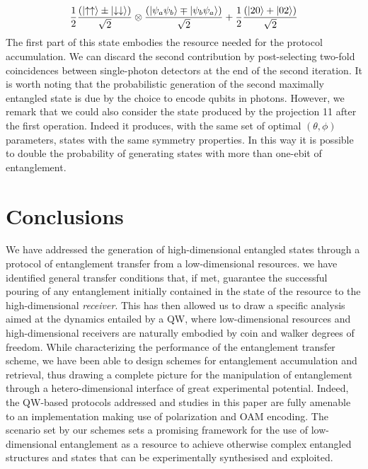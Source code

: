 \documentclass[
	aps, pra,
	superscriptaddress, twocolumn,
	floatfix,
	10pt
]{revtex4-1}
\begin{document}
\begin{align}
\frac{1}{2} \frac{\left( \ket{\uparrow \uparrow} \pm
\ket{\downarrow \downarrow}\right) }{\sqrt{2}}\otimes \frac{\left( \ket{\psi_a \psi_b} \mp
\ket{\psi_b \psi_a}\right) }{\sqrt{2}} +\frac{1}{2}\frac{\left( \ket{20} +
\ket{02}\right) }{\sqrt{2}}
\end{align}
The first part of this state embodies the resource needed for the protocol accumulation. We can discard the second contribution by post-selecting two-fold coincidences between single-photon detectors at the end of the second iteration. It is worth noting that the probabilistic generation of the second maximally entangled state is due by the choice to encode qubits in photons. However, we remark that we could also consider the state produced by the projection 11 after the first operation. Indeed it produces, with the same set of optimal $(\theta, \phi)$ parameters, states with the same symmetry properties. In this way it is possible to double the probability of generating states with more than one-ebit of entanglement.


\section{Conclusions}

We have addressed the generation of high-dimensional entangled states through a protocol of entanglement transfer from a low-dimensional resources. we have identified general transfer conditions that, if met, guarantee the successful pouring of any entanglement initially contained in the state of the resource to the high-dimensional {\it receiver}. This has then allowed us to draw a specific analysis aimed at the dynamics entailed by a QW, where low-dimensional resources and high-dimensional receivers are naturally embodied by coin and walker degrees of freedom. While characterizing the performance of the entanglement transfer scheme, we have been able to design schemes for entanglement accumulation and retrieval, thus drawing a complete picture for the manipulation of entanglement through a hetero-dimensional interface of great experimental potential. Indeed, the QW-based protocols addressed and studies in this paper are fully amenable to an implementation making use of polarization and OAM encoding. The scenario set by our schemes sets a promising framework for the use of low-dimensional entanglement as a resource to achieve otherwise complex entangled structures and states that can be experimentally synthesised and exploited. 
\end{document}
